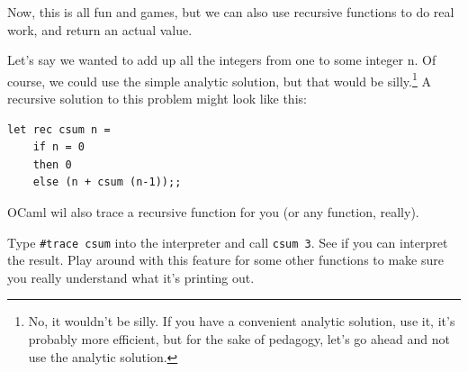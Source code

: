 \documentclass[10pt]{book}
\begin{document}
Now, this is all fun and games, but we can also use recursive functions
to do real work, and return an actual value.

Let's say we wanted to add up all the integers from one to some integer n. Of course, 
we could use the simple analytic solution, but that would be silly.\footnote{No, it 
wouldn't be silly. If you have a convenient analytic solution, use it, it's probably 
more efficient, but for the sake of pedagogy, let's go ahead and not use the analytic 
solution.} A recursive solution to this problem might look like this:

\beforeverb
\begin{verbatim}
let rec csum n = 
	if n = 0
	then 0
	else (n + csum (n-1));;
\end{verbatim}
\afterverb

\begin{ex}
OCaml wil also trace a recursive function for you (or any function, really).

Type {\tt \verb"#trace" csum} into the interpreter and call {\tt csum 3}. See if you 
can interpret the result. Play around with this feature for some other functions
to make sure you really understand what it's printing out.
\end{ex}








\end{document}
